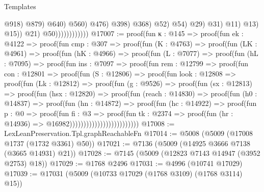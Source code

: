 \begin{lexlean}{Templates}
\begin{coremodule}
                                                              @918)
                                                            @879)
                                                          @640)
                                                        @560)
                                                      @476)
                                                    @398)
                                                  @368)
                                                @52)
                                              @54)
                                            @29)
                                          @31)
                                        @11)
                                      @13)
                                    @15))
                              @21)
                            @50))))))))))))
@17007 := proof(fun {κ : @145} =>
    proof(fun {ek : @4122} =>
      proof(fun {cmp : @307} =>
        proof(fun (K : @4763) =>
          proof(fun (LK : @4961) =>
            proof(fun (hK : @4966) =>
              proof(fun (L : @7077) =>
                proof(fun (hL : @7095) =>
                  proof(fun {ins : @7097} =>
                    proof(fun {rem : @12799} =>
                      proof(fun {con : @12801} =>
                        proof(fun (S : @12806) =>
                          proof(fun {look : @12808} =>
                            proof(fun (Lk : @12812) =>
                              proof(fun (g : @9526) =>
                                proof(fun (sx : @12813) =>
                                  proof(fun (hsx : @12820) =>
                                    proof(fun (reach : @14830) =>
                                      proof(fun (h0 : @14837) =>
                                        proof(fun (hn : @14872) =>
                                          proof(fun (hc : @14922) =>
                                            proof(fun {p : @0} =>
                                              proof(fun {fi : @3} =>
                                                proof(fun {tk : @2374} =>
                                                  proof(fun (hr : @14936) =>
                                                    @16982)))))))))))))))))))))))))
@17008 := LexLeanPreservation.Tpl.graphReachableFn
@17014 := @5008 (@5009 (@17008 @1737 (@1732 @3361) @50))
@17021 := @7136 (@5009 (@14925 @3666 @7138 (@3665 @14931) @21))
@17028 := @7145 (@5009 (@12823 @7143 @14947 (@3952 @2753) @18))
@17029 := @1768 @2496
@17031 := @4996 (@10741 @17029)
@17039 := @17031 (@5009 (@10733 @17029 (@1768 @3109) (@1768 @3114) @15))

\end{coremodule}
\end{lexlean}
